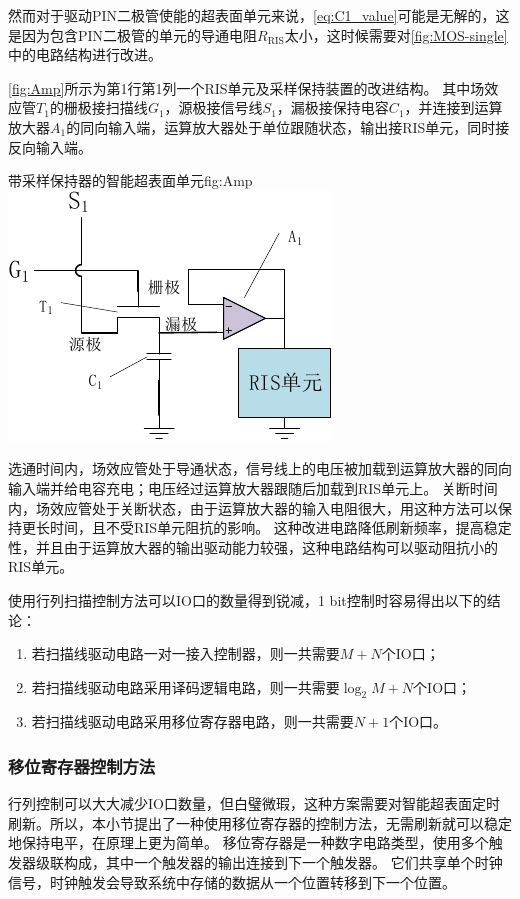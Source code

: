 \documentclass[supercite]{HustGraduPaper}
\begin{document}
然而对于驱动PIN二极管使能的超表面单元来说，\autoref{eq:C1_value}可能是无解的，这是因为包含PIN二极管的单元的导通电阻$R_\mathrm{RIS}$太小，这时候需要对\autoref{fig:MOS-single}中的电路结构进行改进。

\autoref{fig:Amp}所示为第1行第1列一个RIS单元及采样保持装置的改进结构。
其中场效应管$T_1$的栅极接扫描线$G_1$，源极接信号线$S_1$，漏极接保持电容$C_1$，并连接到运算放大器$A_1$的同向输入端，运算放大器处于单位跟随状态，输出接RIS单元，同时接反向输入端。

\begin{generalfig}[htb]{带采样保持器的智能超表面单元}{fig:Amp}
	\includegraphics[width=0.5\linewidth]{Figures/Amp.pdf}
\end{generalfig}

选通时间内，场效应管处于导通状态，信号线上的电压被加载到运算放大器的同向输入端并给电容充电；电压经过运算放大器跟随后加载到RIS单元上。
关断时间内，场效应管处于关断状态，由于运算放大器的输入电阻很大，用这种方法可以保持更长时间，且不受RIS单元阻抗的影响。
这种改进电路降低刷新频率，提高稳定性，并且由于运算放大器的输出驱动能力较强，这种电路结构可以驱动阻抗小的RIS单元。

使用行列扫描控制方法可以IO口的数量得到锐减，1 bit控制时容易得出以下的结论：
\begin{enumerate}
	\item 若扫描线驱动电路一对一接入控制器，则一共需要$M+N$个IO口；
	\item 若扫描线驱动电路采用译码逻辑电路，则一共需要$\log_{2}{M}+N$个IO口；
	\item 若扫描线驱动电路采用移位寄存器电路，则一共需要$N+1$个IO口。
\end{enumerate}

\subsubsection{移位寄存器控制方法}

行列控制可以大大减少IO口数量，但白璧微瑕，这种方案需要对智能超表面定时刷新。所以，本小节提出了一种使用移位寄存器的控制方法，无需刷新就可以稳定地保持电平，在原理上更为简单。
移位寄存器是一种数字电路类型，使用多个触发器级联构成，其中一个触发器的输出连接到下一个触发器。
它们共享单个时钟信号，时钟触发会导致系统中存储的数据从一个位置转移到下一个位置。
\end{document}
